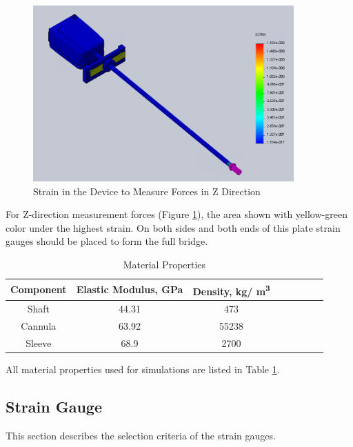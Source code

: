 \begin{figure}[h]
	\begin{center}
		\includegraphics[width=100mm]{fig/methods/z_dir_sim.png}
	\end{center}
	\vspace{-4mm}
	\caption[Strain in the Device to Measure Forces in Z Direction]
	{Strain in the Device to Measure Forces in Z Direction}
	\label{fig:Zdev}
	\vspace{-2mm}
\end{figure}

For Z-direction measurement forces (Figure \ref{fig:Zdev}), the area shown with yellow-green color under the highest strain. On both sides and both ends of this plate strain gauges should be placed to form the full bridge.

\begin{table}
\caption {Material Properties} \label{tab:matProp} 
\begin{center}
\begin{tabular}{ | c | c | c | c | c | c | c | c | } 
\hline
Component & Elastic Modulus, GPa & Density, kg/ m\textsuperscript{3} \\ 
\hline
Shaft & 44.31 & 473\\ 
\hline
Cannula & 63.92 & 55238 \\ 
\hline
Sleeve & 68.9 & 2700  \\ 
\hline
\end{tabular}
\end{center}
\end{table}

All material properties used for simulations are listed in Table \ref{tab:matProp}.

\subsection{Strain Gauge}
	\label{sec:SGReq}
This section describes the selection criteria of the strain gauges.	

